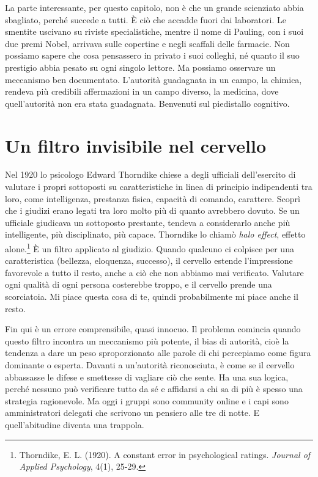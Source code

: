 La parte interessante, per questo capitolo, non è che un grande scienziato abbia sbagliato, perché succede a tutti. È ciò che accadde fuori dai laboratori. Le smentite uscivano su riviste specialistiche, mentre il nome di Pauling, con i suoi due premi Nobel, arrivava sulle copertine e negli scaffali delle farmacie. Non possiamo sapere che cosa pensassero in privato i suoi colleghi, né quanto il suo prestigio abbia pesato su ogni singolo lettore. Ma possiamo osservare un meccanismo ben documentato. L'autorità guadagnata in un campo, la chimica, rendeva più credibili affermazioni in un campo diverso, la medicina, dove quell'autorità non era stata guadagnata. Benvenuti sul piedistallo cognitivo.

\section{Un filtro invisibile nel cervello}

Nel 1920 lo psicologo Edward Thorndike chiese a degli ufficiali dell'esercito di valutare i propri sottoposti su caratteristiche in linea di principio indipendenti tra loro, come intelligenza, prestanza fisica, capacità di comando, carattere. Scopr\`{i} che i giudizi erano legati tra loro molto più di quanto avrebbero dovuto. Se un ufficiale giudicava un sottoposto prestante, tendeva a considerarlo anche pi\`{u} intelligente, pi\`{u} disciplinato, pi\`{u} capace. Thorndike lo chiam\`{o} \textit{halo effect}, effetto alone.\footnote{Thorndike, E. L. (1920). A constant error in psychological ratings. \textit{Journal of Applied Psychology}, 4(1), 25-29.} \`{E} un filtro applicato al giudizio. Quando qualcuno ci colpisce per una caratteristica (bellezza, eloquenza, successo), il cervello estende l'impressione favorevole a tutto il resto, anche a ci\`{o} che non abbiamo mai verificato. Valutare ogni qualit\`{a} di ogni persona costerebbe troppo, e il cervello prende una scorciatoia. Mi piace questa cosa di te, quindi probabilmente mi piace anche il resto.

Fin qui \`{e} un errore comprensibile, quasi innocuo. Il problema comincia quando questo filtro incontra un meccanismo pi\`{u} potente, il bias di autorit\`{a}, cioè la tendenza a dare un peso sproporzionato alle parole di chi percepiamo come figura dominante o esperta. Davanti a un'autorit\`{a} riconosciuta, \`{e} come se il cervello abbassasse le difese e smettesse di vagliare ci\`{o} che sente. Ha una sua logica, perché nessuno può verificare tutto da sé e affidarsi a chi sa di più è spesso una strategia ragionevole. Ma oggi i gruppi sono community online e i capi sono amministratori delegati che scrivono un pensiero alle tre di notte. E quell'abitudine diventa una trappola.


